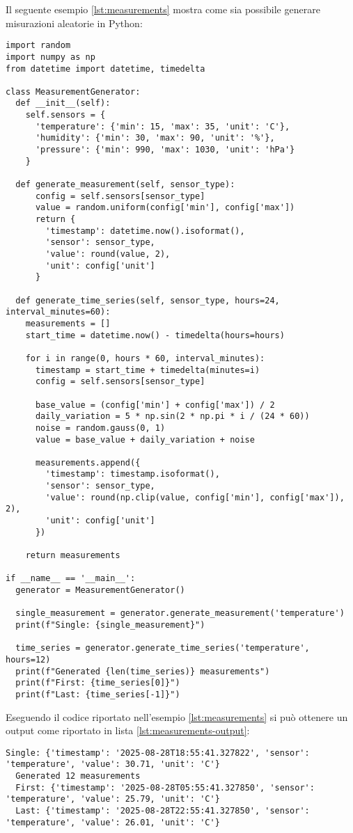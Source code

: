 Il seguente esempio \ref{lst:measurements} mostra come sia possibile generare misurazioni aleatorie in Python:

\begin{lstlisting}[caption={Generazione di misurazioni aleatorie in Python}, label=lst:measurements]
import random
import numpy as np
from datetime import datetime, timedelta

class MeasurementGenerator:
  def __init__(self):
    self.sensors = {
      'temperature': {'min': 15, 'max': 35, 'unit': 'C'},
      'humidity': {'min': 30, 'max': 90, 'unit': '%'},
      'pressure': {'min': 990, 'max': 1030, 'unit': 'hPa'}
    }

  def generate_measurement(self, sensor_type):
      config = self.sensors[sensor_type]
      value = random.uniform(config['min'], config['max'])
      return {
        'timestamp': datetime.now().isoformat(),
        'sensor': sensor_type,
        'value': round(value, 2),
        'unit': config['unit']
      }

  def generate_time_series(self, sensor_type, hours=24, interval_minutes=60):
    measurements = []
    start_time = datetime.now() - timedelta(hours=hours)

    for i in range(0, hours * 60, interval_minutes):
      timestamp = start_time + timedelta(minutes=i)
      config = self.sensors[sensor_type]

      base_value = (config['min'] + config['max']) / 2
      daily_variation = 5 * np.sin(2 * np.pi * i / (24 * 60))
      noise = random.gauss(0, 1)
      value = base_value + daily_variation + noise

      measurements.append({
        'timestamp': timestamp.isoformat(),
        'sensor': sensor_type,
        'value': round(np.clip(value, config['min'], config['max']), 2),
        'unit': config['unit']
      })

    return measurements

if __name__ == '__main__':
  generator = MeasurementGenerator()

  single_measurement = generator.generate_measurement('temperature')
  print(f"Single: {single_measurement}")

  time_series = generator.generate_time_series('temperature', hours=12)
  print(f"Generated {len(time_series)} measurements")
  print(f"First: {time_series[0]}")
  print(f"Last: {time_series[-1]}")
\end{lstlisting}

Eseguendo il codice riportato nell'esempio \ref{lst:measurements} si può ottenere un output come riportato
in lista \ref{lst:measurements-output}:
\begin{lstlisting}[caption={Output di esempio ottenuto dalla generazione di misurazioni aleatorie in Python},
  label=lst:measurements-output]
  Single: {'timestamp': '2025-08-28T18:55:41.327822', 'sensor': 'temperature', 'value': 30.71, 'unit': 'C'}
  Generated 12 measurements
  First: {'timestamp': '2025-08-28T05:55:41.327850', 'sensor': 'temperature', 'value': 25.79, 'unit': 'C'}
  Last: {'timestamp': '2025-08-28T22:55:41.327850', 'sensor': 'temperature', 'value': 26.01, 'unit': 'C'}
\end{lstlisting}

